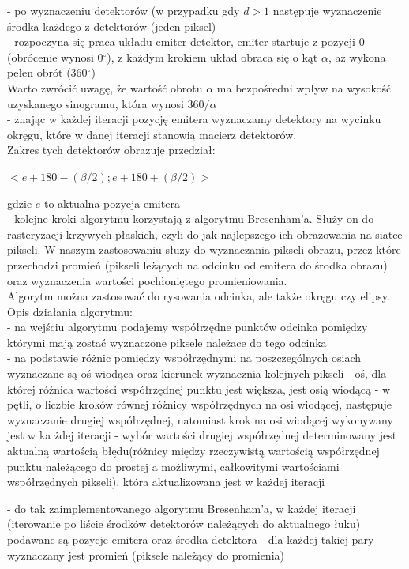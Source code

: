 \documentclass[A_4paper,12pt]{article}
\begin{document}
\begin{itemize}
- po wyznaczeniu detektorów (w przypadku gdy $d>1$ następuje wyznaczenie środka każdego z detektorów (jeden piksel) \\
- rozpoczyna się praca układu emiter-detektor, emiter startuje z pozycji 0 (obrócenie wynosi 0$^\circ$), z każdym krokiem układ obraca się o kąt $\alpha$, aż wykona pełen obrót (360$^\circ$) \\ Warto zwrócić uwagę, że wartość obrotu $\alpha$ ma bezpośredni wpływ na wysokość uzyskanego sinogramu, która wynosi $360/\alpha$ \\
- znając w każdej iteracji pozycję emitera wyznaczamy detektory na wycinku okręgu, które w danej iteracji stanowią macierz detektorów. \\
Zakres tych detektorów obrazuje przedział:
\begin{center}
$<e + 180 - (\beta/2) ; e + 180 + (\beta/2)>$
\end{center}
gdzie $e$ to aktualna pozycja emitera\\
- kolejne kroki algorytmu korzystają z algorytmu Bresenham'a. 
Służy on do rasteryzacji krzywych płaskich, czyli do jak najlepszego ich obrazowania na siatce pikseli.
W naszym zastosowaniu służy do wyznaczania pikseli obrazu, przez które przechodzi promień (pikseli leżących na odcinku od emitera do środka obrazu) oraz wyznaczenia wartości pochłoniętego promieniowania. \\
Algorytm można zastosować do rysowania odcinka, ale także okręgu czy elipsy. \\
Opis działania algorytmu: \\
- na wejściu algorytmu podajemy współrzędne punktów odcinka pomiędzy którymi mają zostać wyznaczone piksele należace do tego odcinka \\
- na podstawie różnic pomiędzy współrzędnymi na poszczególnych osiach wyznaczane są oś wiodąca oraz kierunek wyznacznia kolejnych pikseli
- oś, dla której różnica wartości współrzędnej punktu jest większa, jest osią wiodącą
- w pętli, o liczbie kroków równej różnicy współrzędnych na osi wiodącej, następuje wyznaczanie drugiej współrzędnej, natomiast krok na osi wiodącej wykonywany jest w ka żdej iteracji
- wybór wartości drugiej współrzędnej determinowany jest aktualną wartością błędu(różnicy między rzeczywistą wartością współrzędnej punktu należącego do prostej a możliwymi, całkowitymi wartościami współrzędnych pikseli), która aktualizowana jest w każdej iteracji

- do tak zaimplementowanego algorytmu Bresenham'a, w każdej iteracji (iterowanie po liście środków detektorów należących do aktualnego łuku) podawane są pozycje emitera oraz środka detektora
- dla każdej takiej pary wyznaczany jest promień (piksele należący do promienia)



\end{itemize}
\end{document}
